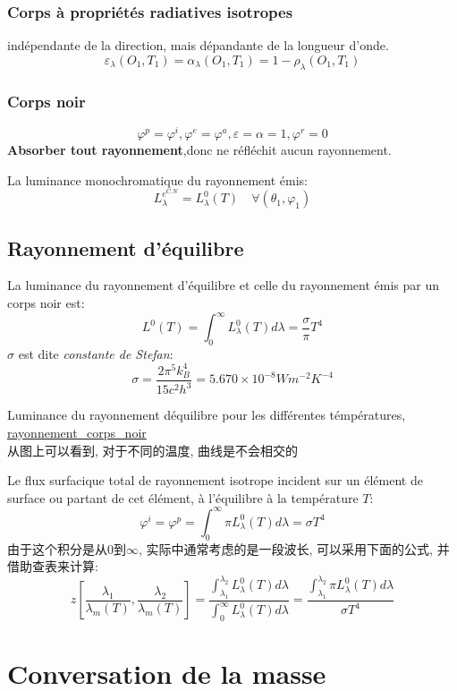 \documentclass{article}
\begin{document}
\subsubsection{Corps \`a propri\'et\'es radiatives isotropes}
ind\'ependante de la direction, mais d\'epandante de la longueur d'onde.
$$\varepsilon_{\lambda}(O_1, T_1) = \alpha_{\lambda}(O_1, T_1) = 1 - \rho_{\lambda}(O_1, T_1)$$

\subsubsection{Corps noir}
$$\varphi^p = \varphi^i,\varphi^e = \varphi^a,\varepsilon=\alpha=1,\varphi^r=0$$
\textbf{Absorber tout rayonnement},donc ne r\'efl\'echit aucun rayonnement.

La luminance monochromatique du rayonnement \'emis:
$$L_{\lambda}^{e^{C.N}}= L_{\lambda}^0(T) \quad \forall(\theta_1,\varphi_1)$$

\subsection{Rayonnement d'\'equilibre}
La luminance du rayonnement d'\'equilibre et celle du rayonnement \'emis par un corps noir est:
$$L^0(T)=\int_{0}^{\infty}L_{\lambda}^0(T)d \lambda =\frac{\sigma}{\pi}T^4$$
$\sigma$ est dite \textit{constante de Stefan}:
$$\sigma=\frac{ 2\pi^5 k_B^4}{15c^2 h^3}=5.670\times 10^{-8} Wm^{-2}K^{-4}$$

Luminance du rayonnement d\'equilibre pour les diff\'erentes t\'emp\'eratures, \href{http://www.afhalifax.ca/magazine/wp-content/sciences/Planck/Le\%20corps\%20noir\_files/rayonnement\_corps\_noir.png}{rayonnement\_corps\_noir}\\
从图上可以看到, 对于不同的温度, 曲线是不会相交的

Le flux surfacique total de rayonnement isotrope incident sur un \'el\'ement de surface ou partant de cet \'el\'ement, \`a l'\'equilibre \`a la temp\'erature $T$:
$$\varphi^i=\varphi^p=\int_{0}^{\infty}\pi L_{\lambda}^0(T)d \lambda =\sigma T^4$$
由于这个积分是从$0$到$\infty$, 实际中通常考虑的是一段波长, 可以采用下面的公式, 并借助查表来计算:
$$
z[\frac{ \lambda _1}{\lambda _m(T)}, \frac{ \lambda _2}{\lambda _m(T)}]
= \frac{ \int_{\lambda _1}^{\lambda _2} L_{\lambda}^0(T)d \lambda }{\int_{0}^{\infty}L_{\lambda}^0(T)d \lambda }
= \frac{ \int_{\lambda _1}^{\lambda _2}\pi L_{\lambda}^0(T)d \lambda }{\sigma T^4}
$$

\section{Conversation de la masse}
\end{document}
